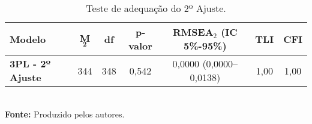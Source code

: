  \begin{comment}
 	conteúdo.\begin{table}[!htb]
 		\centering
 		\caption{Teste de adequação do 2ª Ajuste.}
 		\label{tabela-m2-2}
 		\begin{tabular}{lcccccccc}
 			\hline
 			\textbf{Modelo} & \textbf{M}$_\textbf{2}$ & \textbf{df} &\textbf{ p-valor} & \textbf{RMSEA} & \textbf{RMSEA$_\textbf{5}$} & \textbf{RMSEA$_{\textbf{95}}$} & \textbf{TLI} & \textbf{CFI} \\ 
 			\hline 
 			\textbf{3PL - 2º Ajuste} & 344 & 348 & 0,542 & 0,0000 & 0,0000 & 0,01377 & 1,00 & 1,00 \\ 
 			\hline
 		\end{tabular}\\
 		\vspace*{0.5cm}
 		\small{\textbf{Fonte:} Produzido pelos autores.}
 	\end{table}..
 \end{comment}

\begin{table}[!htb]
	\centering
	\caption{Teste de adequação do 2º Ajuste.}
	\label{tabela-m2-2}
	\begin{tabular}{lcccccc}
		\hline
		\textbf{Modelo} & \textbf{M}$_\textbf{2}$ & \textbf{df} & \textbf{p-valor} & \textbf{RMSEA$_2$ (IC 5\%-95\%)} & \textbf{TLI} & \textbf{CFI} \\ 
		\hline 
		\textbf{3PL - 2º Ajuste} & 344 & 348 & 0,542 & 0,0000 (0,0000--0,0138) & 1,00 & 1,00 \\ 
		\hline
	\end{tabular}\\
	\vspace*{0.5cm}
	\small{\textbf{Fonte:} Produzido pelos autores.}
\end{table}


